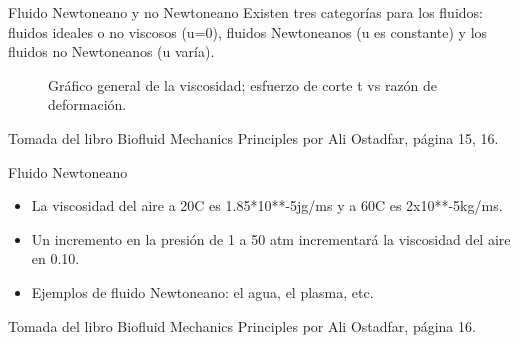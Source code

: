 \begin{frame}{Fluido Newtoneano y no Newtoneano}
\justifying
Existen tres categorías para los fluidos: fluidos ideales o no viscosos (u=0), fluidos Newtoneanos (u es constante) y los fluidos no Newtoneanos (u varía).
\begin{figure}
\centering
{}
\caption{Gráfico general de la viscosidad; esfuerzo de corte t vs razón de deformación.}
\label{f:newandnotnew}
\end{figure}
{\tiny Tomada del libro Biofluid Mechanics Principles por Ali Ostadfar, página 15, 16.}
\end{frame}

\begin{frame}{Fluido Newtoneano}
\justifying
\begin{itemize}
\item La viscosidad del aire a 20C es 1.85*10**-5jg/ms y a 60C es 2x10**-5kg/ms.
\item Un incremento en la presión de 1 a 50 atm incrementará la viscosidad del aire en 0.10.
\item Ejemplos de fluido Newtoneano: el agua, el plasma, etc.
\end{itemize}
{\tiny Tomada del libro Biofluid Mechanics Principles por Ali Ostadfar, página 16.}
\end{frame}

